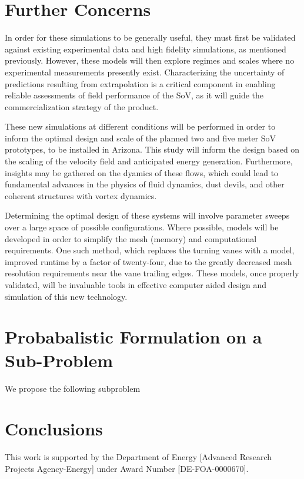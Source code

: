 \documentclass{article}
\begin{document}
%
%
\section{Further Concerns}


In order for these simulations to be generally useful, they must first
be validated against existing experimental data and high fidelity
simulations, as mentioned previously. 
However, these models will then explore regimes and scales where no
experimental measurements presently exist. Characterizing the
uncertainty of predictions resulting from extrapolation is a critical
component in enabling reliable assessments of field performance of the
SoV, as it will guide the commercialization strategy of the product.

These new simulations at different conditions will be performed in order
to inform the optimal design and scale of the planned two and five meter
SoV prototypes, to be installed in Arizona. This study will inform the
design based on the scaling of the velocity field and anticipated energy
generation. Furthermore, insights may be gathered on the dyamics of
these flows, which could lead to fundamental advances in the physics of
fluid dynamics, dust devils, and other coherent structures with vortex 
dynamics\cite{Mullen1977181,smithleslie,kanak}. 


Determining the optimal design of these systems will involve parameter
sweeps over a large space of possible configurations. Where possible,
models will be developed in order to simplify the mesh (memory) and
computational requirements. One such method, which replaces the turning
vanes with a model, improved runtime by a factor of twenty-four, due to
the greatly decreased mesh resolution requirements near the vane
trailing edges. These models, once properly validated, will be
invaluable tools in effective computer aided design and simulation of
this new technology.  







%
%
%
%
\section{Probabalistic Formulation on a Sub-Problem}


We propose the following subproblem

%
%
%
\section{Conclusions}




%
%
\newpage
This work is supported by the Department of Energy [Advanced Research
Projects Agency-Energy] under Award Number [DE-FOA-0000670].   
\end{document}

